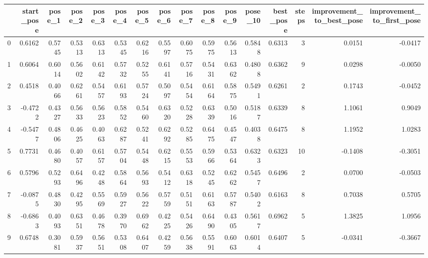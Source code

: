 \begin{tabular}{lrrrrrrrrrrrrrrr}
\toprule
{} &  start\_pose &  pose\_1 &  pose\_2 &  pose\_3 &  pose\_4 &  pose\_5 &  pose\_6 &  pose\_7 &  pose\_8 &  pose\_9 &  pose\_10 &  best\_pose &  steps &  improvement\_to\_best\_pose &  improvement\_to\_first\_pose \\
\midrule
0   &      0.6162 &  0.5745 &  0.5313 &  0.6313 &  0.5345 &  0.6216 &  0.5597 &  0.6075 &  0.5975 &  0.5613 &   0.5848 &     0.6313 &      3 &                    0.0151 &                    -0.0417 \\
1   &      0.6064 &  0.6014 &  0.5602 &  0.6142 &  0.5732 &  0.5255 &  0.6141 &  0.5716 &  0.5431 &  0.6362 &   0.4808 &     0.6362 &      9 &                    0.0298 &                    -0.0050 \\
2   &      0.4518 &  0.4066 &  0.6261 &  0.5457 &  0.6193 &  0.5724 &  0.5097 &  0.5454 &  0.6164 &  0.5875 &   0.5491 &     0.6261 &      2 &                    0.1743 &                    -0.0452 \\
3   &     -0.4722 &  0.4327 &  0.5633 &  0.5623 &  0.5852 &  0.5460 &  0.6320 &  0.5228 &  0.6339 &  0.5016 &   0.5187 &     0.6339 &      8 &                    1.1061 &                     0.9049 \\
4   &     -0.5477 &  0.4806 &  0.4625 &  0.4063 &  0.6287 &  0.5241 &  0.6292 &  0.5285 &  0.6475 &  0.4547 &   0.4038 &     0.6475 &      8 &                    1.1952 &                     1.0283 \\
5   &      0.7731 &  0.4680 &  0.4057 &  0.6157 &  0.5704 &  0.5448 &  0.6215 &  0.5553 &  0.5966 &  0.5364 &   0.6323 &     0.6323 &     10 &                   -0.1408 &                    -0.3051 \\
6   &      0.5796 &  0.5293 &  0.6496 &  0.4248 &  0.5864 &  0.5693 &  0.5412 &  0.6318 &  0.5245 &  0.6262 &   0.5457 &     0.6496 &      2 &                    0.0700 &                    -0.0503 \\
7   &     -0.0875 &  0.4830 &  0.4295 &  0.5569 &  0.5927 &  0.5622 &  0.5759 &  0.5151 &  0.6163 &  0.5787 &   0.5402 &     0.6163 &      8 &                    0.7038 &                     0.5705 \\
8   &     -0.6863 &  0.4093 &  0.6351 &  0.4678 &  0.3970 &  0.6962 &  0.4225 &  0.5426 &  0.6490 &  0.4305 &   0.5617 &     0.6962 &      5 &                    1.3825 &                     1.0956 \\
9   &      0.6748 &  0.3081 &  0.5937 &  0.5651 &  0.5308 &  0.6407 &  0.4259 &  0.5638 &  0.5591 &  0.6063 &   0.6014 &     0.6407 &      5 &                   -0.0341 &                    -0.3667 \\

\end{tabular}
